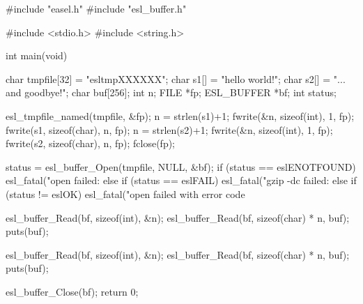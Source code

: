 \begin{cchunk}
#include "easel.h"
#include "esl_buffer.h"

#include <stdio.h>
#include <string.h>

int main(void)
{
  char        tmpfile[32] = "esltmpXXXXXX";
  char        s1[]        = "hello world!";
  char        s2[]        = "... and goodbye!";
  char        buf[256];
  int         n;
  FILE       *fp;
  ESL_BUFFER *bf;
  int         status;

  esl_tmpfile_named(tmpfile, &fp);
  n = strlen(s1)+1; fwrite(&n, sizeof(int), 1, fp); fwrite(s1, sizeof(char), n, fp);
  n = strlen(s2)+1; fwrite(&n, sizeof(int), 1, fp); fwrite(s2, sizeof(char), n, fp);
  fclose(fp);

  status = esl_buffer_Open(tmpfile, NULL, &bf);
  if      (status == eslENOTFOUND) esl_fatal("open failed: %
  else if (status == eslFAIL)      esl_fatal("gzip -dc failed: %
  else if (status != eslOK)        esl_fatal("open failed with error code %
  
  esl_buffer_Read(bf, sizeof(int), &n);
  esl_buffer_Read(bf, sizeof(char) * n, buf);
  puts(buf);

  esl_buffer_Read(bf, sizeof(int), &n);
  esl_buffer_Read(bf, sizeof(char) * n, buf);
  puts(buf);
  
  esl_buffer_Close(bf);
  return 0;
}
\end{cchunk}

